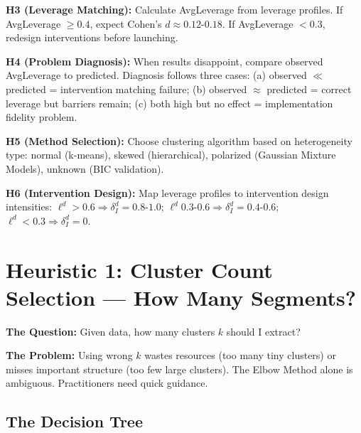 \textbf{H3 (Leverage Matching):} Calculate AvgLeverage from leverage profiles. If AvgLeverage $\geq 0.4$, expect Cohen's $d \approx 0.12$-$0.18$. If AvgLeverage $< 0.3$, redesign interventions before launching.

\textbf{H4 (Problem Diagnosis):} When results disappoint, compare observed AvgLeverage to predicted. Diagnosis follows three cases: (a) observed $\ll$ predicted = intervention matching failure; (b) observed $\approx$ predicted = correct leverage but barriers remain; (c) both high but no effect = implementation fidelity problem.

\textbf{H5 (Method Selection):} Choose clustering algorithm based on heterogeneity type: normal (k-means), skewed (hierarchical), polarized (Gaussian Mixture Models), unknown (BIC validation).

\textbf{H6 (Intervention Design):} Map leverage profiles to intervention design intensities: $\ell^d > 0.6 \Rightarrow \delta_I^d = 0.8$-$1.0$; $\ell^d 0.3$-$0.6 \Rightarrow \delta_I^d = 0.4$-$0.6$; $\ell^d < 0.3 \Rightarrow \delta_I^d = 0$.

\vspace{1em}


\section{Heuristic 1: Cluster Count Selection --- How Many Segments?}
\label{sec:h1-cluster-count}

\textbf{The Question:} Given data, how many clusters $k$ should I extract?

\textbf{The Problem:} Using wrong $k$ wastes resources (too many tiny clusters) or misses important structure (too few large clusters). The Elbow Method alone is ambiguous. Practitioners need quick guidance.

\subsection{The Decision Tree}

